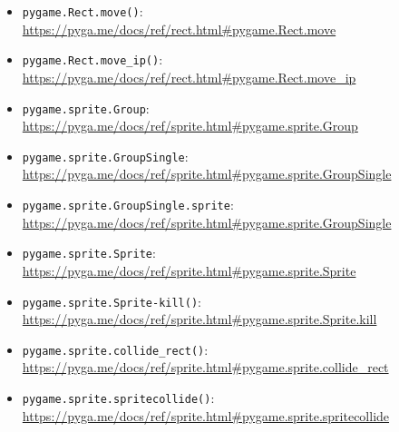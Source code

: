 \begin{pygbox}
\begin{itemize}
	\item \texttt{pygame.Rect.move()}:
	\\
	\url{https://pyga.me/docs/ref/rect.html#pygame.Rect.move}

	\item \texttt{pygame.Rect.move\_ip()}:
	\\
	\url{https://pyga.me/docs/ref/rect.html#pygame.Rect.move_ip}

	\item \texttt{pygame.sprite.Group}:
	\\
	\url{https://pyga.me/docs/ref/sprite.html#pygame.sprite.Group}

	\item \texttt{pygame.sprite.GroupSingle}:
	\\
	\url{https://pyga.me/docs/ref/sprite.html#pygame.sprite.GroupSingle}

	\item \texttt{pygame.sprite.GroupSingle.sprite}:
	\\
    \url{https://pyga.me/docs/ref/sprite.html#pygame.sprite.GroupSingle}

	\item \texttt{pygame.sprite.Sprite}:
	\\
	\url{https://pyga.me/docs/ref/sprite.html#pygame.sprite.Sprite}
	
	\item \texttt{pygame.sprite.Sprite-kill()}:
	\\
	\url{https://pyga.me/docs/ref/sprite.html#pygame.sprite.Sprite.kill}

	\item \texttt{pygame.sprite.collide\_rect()}:
	\\
	\url{https://pyga.me/docs/ref/sprite.html#pygame.sprite.collide_rect}
	
	\item \texttt{pygame.sprite.spritecollide()}:
    \\
    \url{https://pyga.me/docs/ref/sprite.html#pygame.sprite.spritecollide}
\end{itemize}
\end{pygbox}

